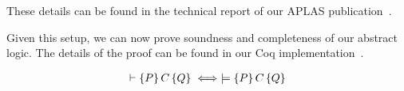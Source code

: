 \begin{comment}
Notice that this example does not give a contradiction when using the weaker form of locality, since
we are then free to set $f(\sigma_1 \bullet \sigma_2) = \emp$ (meaning that the action never terminates
when run on the combined state). This is precisely what is done in~\cite{coy07} to deal with the situation.

Fundamentally, the reason why the above example causes a problem is that the axioms specify incompatible 
behaviors on two substates on some particular state. We will therefore resolve the problem by
requiring that our axioms never do this. Specifically, consider a situation where we have axioms $\assert{p_1}{c}{q_1}$
and $\assert{p_2}{c}{q_2}$, and states $\sigma, \sigma_1, \sigma_2$ such that $\sigma_1 \preceq \sigma$,
$\sigma_2 \preceq \sigma$, $\sigma_1 \in p_1$, and $\sigma_2 \in p_2$. Let $\bar{\sigma}_1$ and $\bar{\sigma}_2$
be the states such that $\sigma_1 \bullet \bar{\sigma}_1 = \sigma_2 \bullet \bar{\sigma}_2 = \sigma$.
Then we interpret the first axiom as saying that $f(\sigma) = q_1^{dom(\sigma_1)} * \{\bar{\sigma}_1\}$, and
similarly the second axiom says that $f(\sigma) = q_2^{dom(\sigma_2)} * \{\bar{\sigma}_2\}$. We therefore
need to require that $q_1^{dom(\sigma_1)} * \{\bar{\sigma}_1\} = q_2^{dom(\sigma_2)} * \{\bar{\sigma}_2\}$.
The formal definition of this property follows.

\vspace*{0.5ex}
\begin{definition}
Given that $\sigma_0 \preceq \sigma$, define the notation $\sigma - \sigma_0$ to be the unique state $\sigma_1$ such that
$\sigma = \sigma_0 \bullet \sigma_1$ (uniqueness is implied by the cancellativity property of separation algebras).
Then, given set of axioms $Ax$, we say that $Ax$ is \emph{permissible} if, for any primitive command $c$, and any (not necessarily distinct) axioms 
$\assert{p_1}{c}{q_1}$ and $\assert{p_2}{c}{q_2}$ in $Ax_c$, and any states $\sigma, \sigma_1, \sigma_2$, the following holds:
\[\begin{array}{l} \sigma_1 \preceq \sigma \land \sigma_2 \preceq \sigma \land \sigma_1 \in p_1 \land \sigma_2 \in p_2 \\
\hspace{5mm} \Longrightarrow q_1^{dom(\sigma_1)} * \{\sigma - \sigma_1\} = q_2^{dom(\sigma_2)} * \{\sigma - \sigma_2\} \end{array}\]
We require that all instantiations of the abstract logic use permissible axiom sets.
\end{definition}
\else
\end{comment}
These details can be found in the technical report of our APLAS publication~\cite{costanzo12:bpsltr}.

Given this setup, we can now prove soundness and completeness of our 
abstract logic. The details of the proof can be found in our Coq implementation~\cite{costanzo-thesis}.
\begin{thm}
\begin{align*}
\vdash \{P\}\,C\,\{Q\} \iff \models \left\{P\right\} C \left\{Q\right\}
\end{align*}
\end{thm}
